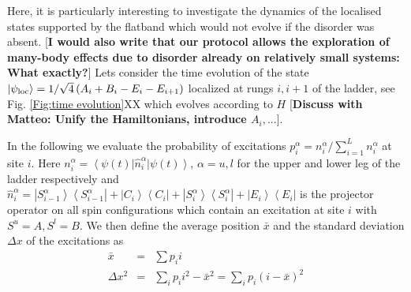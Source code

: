 \documentclass[prl,aps,twocolumn,showpacs,superscriptaddress,longbibliography]{revtex4-1}
\newcommand{\lan}{\left\langle}
\newcommand{\ran}{\right\rangle}
\newcommand{\ket}[1]{\left| #1 \ran}
\newcommand{\bra}[1]{\lan #1 \right|}
\begin{document}
Here, it is particularly interesting to investigate the dynamics of the localised states supported by the flatband which would not evolve if the disorder was absent. [{\bf I would also write that our protocol allows the exploration of many-body effects due to disorder already on relatively small systems: What exactly?}] Lets consider the time evolution of the state $\ket{\psi_{\rm loc}} = 1/\sqrt{4} \left( A_i + B_i - E_i - E_{i+1} \right)$ localized at rungs $i,i+1$ of the ladder, see Fig. \ref{Fig:time evolution}XX which evolves according to $H$ [{\bf Discuss with Matteo: Unify the Hamiltonians, introduce $A_i,...$}]. 


In the following we evaluate the probability of excitations $p^\alpha_i = n^\alpha_i/\sum_{i=1}^{L} n^\alpha_i$ at site $i$. Here $n^\alpha_i = \bra{\psi(t)} \hat{n}^\alpha_i \ket{\psi(t)}$, $\alpha=u,l$ for the upper and lower leg of the ladder respectively and $\hat{n}^\alpha_i = \ket{S^\alpha_{i-1}}\bra{S^\alpha_{i-1}} + \ket{C_{i}}\bra{C_{i}} + \ket{S^\alpha_{i}}\bra{S^\alpha_{i}} + \ket{E_{i}}\bra{E_{i}}$ is the projector operator on all spin configurations which contain an excitation at site $i$ with $S^u=A, S^l=B$.
We then define the average position $\bar{x}$ and the standard deviation $\Delta x$ of the excitations as
\begin{eqnarray}
	\bar{x} &=& \sum p_i i \\
	\Delta x^2 &=& \sum_i p_i i^2 - \bar{x}^2 = \sum_i p_i (i-\bar{x})^2
	\label{eq:Delta x}
\end{eqnarray}
\end{document}
